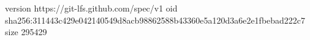 version https://git-lfs.github.com/spec/v1
oid sha256:311443c429e042140549d8acb98862588b43360e5a120d3a6e2e1fbebad222c7
size 295429
